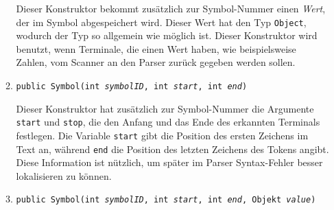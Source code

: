 \begin{enumerate}
\begin{enumerate}
            Dieser Konstruktor bekommt zus\"atzlich zur Symbol-Nummer einen \emph{Wert}, der im Symbol
            abgespeichert wird. Dieser Wert hat den Typ \texttt{Object}, wodurch der Typ so
            allgemein wie m\"oglich ist.  Dieser
            Konstruktor wird benutzt, wenn Terminale, die einen Wert haben, wie beispielsweise
            Zahlen, vom Scanner an den Parser zur\"uck gegeben werden sollen.
      \item \texttt{public Symbol(int \textsl{symbolID}, int \textsl{start}, int \textsl{end})}

            Dieser Konstruktor hat zus\"atzlich zur Symbol-Nummer die Argumente \texttt{start}  und
            \texttt{stop}, die den Anfang und das Ende des erkannten Terminals festlegen.  Die Variable
            \texttt{start} gibt die Position des ersten Zeichens im Text an, w\"ahrend \texttt{end}
            die Position des letzten Zeichens des Tokens angibt.  Diese Information ist n\"utzlich,
            um sp\"ater im Parser Syntax-Fehler besser lokalisieren zu k\"onnen.
      \item \texttt{public Symbol(int \textsl{symbolID}, int  \textsl{start}, int \textsl{end},
                    Objekt \textsl{value})}


\end{enumerate}
\end{enumerate}
